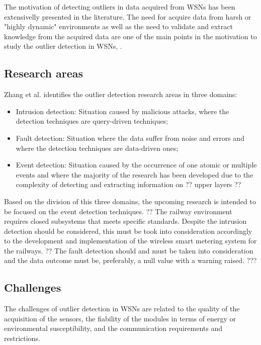 The motivation of detecting outliers in data acquired from WSNs has been extensivelly presented in the literature. The need for acquire data from harsh or "highly dynamic" environments as well as the need to validate and extract knowledge from the acquired data are one of the main points in the motivation to study the outlier detection in WSNs,  \cite{gen:zhang:2010,gen:chandola:2009,stat:ghorbel:2015,class:martins:2015b}.



\subsection{Research areas}
Zhang et al. \cite{gen:zhang:2010} identifies the outlier detection research areas in three domains: 

\begin{itemize}
	\item Intrusion detection: Situation caused by malicious attacks, where the detection techniques are query-driven techniques;
	
	\item Fault detection: Situation where the data suffer from noise and errors and where the detection techniques are data-driven ones;
	
	\item Event detection: Situation caused by the occurrence of one atomic or multiple events and where the majority of the research has been developed due to the complexity of detecting and extracting information on ?? upper layers ??
\end{itemize}

Based on the division of this three domains, the upcoming research is intended to be focused on the event detection techniques. ?? The railway environment requires closed subsystems that meets specific standards. Despite the intrusion detection should be considered, this must be took into consideration accordingly to the development and implementation of the wireless smart metering system for the railways. ?? The fault detection should and must be taken into consideration and the data outcome must be, preferably, a null value with a warning raised. ???

\subsection{Challenges}

The challenges of outlier detection in WSNs are related to the quality of the acquisition of the sensors, the fiability of the modules in terms of energy or environmental susceptibility, and the communication requirements and restrictions.

